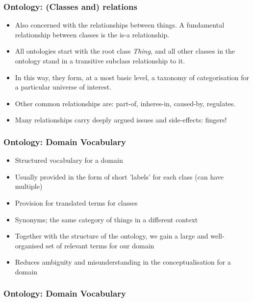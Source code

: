 \documentclass{beamer}
\begin{document}
\begin{frame}
\frametitle{Ontology: (Classes and) relations}
\begin{itemize}
  \item Also concerned with the relationships between things. A fundamental
  relationship between classes is the is-a relationship.
  \item All ontologies start with the root class \emph{Thing}, and all other 
  classes in the ontology stand in a transitive subclass relationship to it.
  \item In this way, they form, at a most basic level, a taxonomy of
  categorisation for a particular universe of interest.
  \item Other common relationships are: part-of, inheres-in, caused-by,
  regulates.
  \item Many relationships carry deeply argued issues and side-effects: fingers!
\end{itemize}
\end{frame}

\begin{frame}
\frametitle{Ontology: Domain Vocabulary}

\begin{itemize}
  \item Structured vocabulary for a domain
  \item Usually provided in the form of short 'labels' for each class (can have
  multiple)
  \item Provision for translated terms for classes
  \item Synonyms; the same category of things in a different context
  \item Together with the structure of the ontology, we gain a large and
  well-organised set of relevant terms for our domain
  \item Reduces ambiguity and misunderstanding in the conceptualisation for a
  domain
\end{itemize}
\end{frame}

\begin{frame}
\frametitle{Ontology: Domain Vocabulary}
\end{frame}
\end{document}
